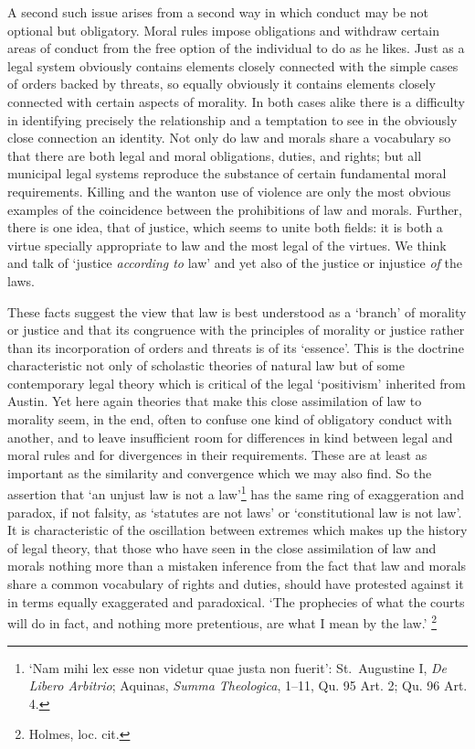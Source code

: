 \documentclass[12pt,oneside]{book}  %
\begin{document}
A second such issue arises from a second way in which conduct may be not
optional but obligatory. Moral rules impose obligations and withdraw
certain areas of conduct from the free option of the individual to do as
he likes. Just as a legal system obviously contains elements closely
connected with the simple cases of orders backed by threats, so equally
obviously it contains elements closely connected with certain aspects of
morality. In both cases alike there is a difficulty in identifying
precisely the relationship and a temptation to see in the obviously
close connection an identity. Not only do law and morals share a
vocabulary so that there are both legal and moral obligations, duties,
and rights; but all municipal legal systems reproduce the substance of
certain fundamental moral requirements. Killing and the wanton use of
violence are only the most obvious examples of the coincidence between
the prohibitions of law and morals. Further, there is one idea, that of
justice, which seems to unite both fields: it is both a virtue specially
appropriate to law and the most legal of the virtues. We think and talk
of `justice \emph{according to} law' and yet also of the justice or
injustice \emph{of} the laws.

These facts suggest the view that law is best understood as a `branch'
of morality or justice and that its congruence with the principles of
morality or justice rather than its incorporation of orders and threats
is of its `essence'. This is the doctrine characteristic not only of
scholastic theories of natural law but of some contemporary legal theory
which is critical of the legal `positivism' inherited from Austin. Yet
here again theories that make this close assimilation of law to morality
seem, in the end, often to confuse one kind of obligatory conduct with
another, and to leave insufficient room for differences in kind between
legal and moral rules and for divergences in their requirements. These
are at least as important as the similarity and convergence which we may
also find. So the assertion that `an unjust law is not a law'\footnote{`Nam
  mihi lex esse non videtur quae justa non fuerit': St.~Augustine I,
  \emph{De Libero Arbitrio}; Aquinas, \emph{Summa Theologica}, 1--11,
  Qu. 95 Art. 2; Qu. 96 Art. 4.} has the same ring of exaggeration and
paradox, if not falsity, as `statutes are not laws' or `constitutional
law is not law'. It is characteristic of the oscillation between
extremes which makes up the history of legal theory, that those who have
seen in the close assimilation of law and morals nothing more than a
mistaken inference from the fact that law and morals share a common
vocabulary of rights and duties, should have protested against it in
terms equally exaggerated and paradoxical. `The prophecies of what the
courts will do in fact, and nothing more pretentious, are what I mean by
the law.' \footnote{Holmes, loc. cit.}
\end{document}
